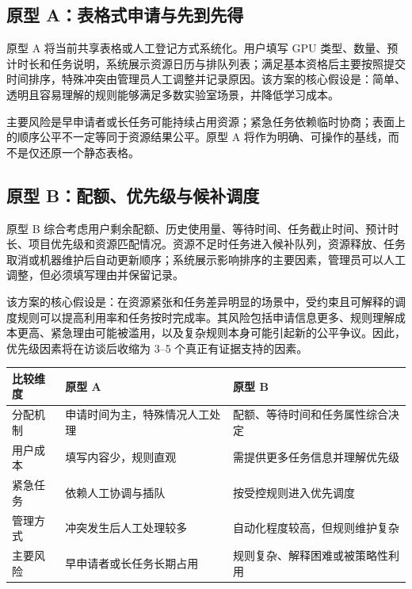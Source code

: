 \documentclass[UTF8,10.5pt,a4paper,fontset=mac]{ctexart}
\begin{document}
\subsection{原型 A：表格式申请与先到先得}

原型 A 将当前共享表格或人工登记方式系统化。用户填写 GPU 类型、数量、预计时长和任务说明，系统展示资源日历与排队列表；满足基本资格后主要按照提交时间排序，特殊冲突由管理员人工调整并记录原因。该方案的核心假设是：简单、透明且容易理解的规则能够满足多数实验室场景，并降低学习成本。

主要风险是早申请者或长任务可能持续占用资源；紧急任务依赖临时协商；表面上的顺序公平不一定等同于资源结果公平。原型 A 将作为明确、可操作的基线，而不是仅还原一个静态表格。

\subsection{原型 B：配额、优先级与候补调度}

原型 B 综合考虑用户剩余配额、历史使用量、等待时间、任务截止时间、预计时长、项目优先级和资源匹配情况。资源不足时任务进入候补队列，资源释放、任务取消或机器维护后自动更新顺序；系统展示影响排序的主要因素，管理员可以人工调整，但必须填写理由并保留记录。

该方案的核心假设是：在资源紧张和任务差异明显的场景中，受约束且可解释的调度规则可以提高利用率和任务按时完成率。其风险包括申请信息更多、规则理解成本更高、紧急理由可能被滥用，以及复杂规则本身可能引起新的公平争议。因此，优先级因素将在访谈后收缩为 3--5 个真正有证据支持的因素。

\begin{table}[htbp]
\centering
\small
\begin{tabularx}{\linewidth}{L{2.3cm}Y Y}
\toprule
\textbf{比较维度} & \textbf{原型 A} & \textbf{原型 B} \\
\midrule
分配机制 & 申请时间为主，特殊情况人工处理 & 配额、等待时间和任务属性综合决定 \\
用户成本 & 填写内容少，规则直观 & 需提供更多任务信息并理解优先级 \\
紧急任务 & 依赖人工协调与插队 & 按受控规则进入优先调度 \\
管理方式 & 冲突发生后人工处理较多 & 自动化程度较高，但规则维护复杂 \\
主要风险 & 早申请者或长任务长期占用 & 规则复杂、解释困难或被策略性利用 \\
\bottomrule
\end{tabularx}
\end{table}
\end{document}
